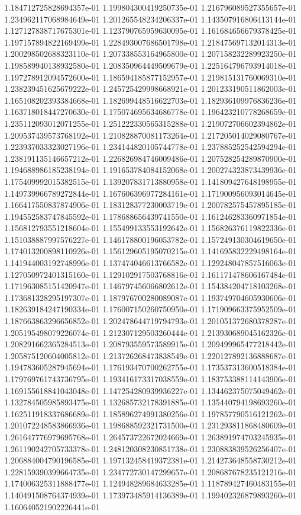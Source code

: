 1.184712725828694357e-01
1.199804300419250735e-01
1.216796089527355657e-01
1.234962117068984649e-01
1.201265548234206337e-01
1.143507916806413144e-01
1.127127838717675301e-01
1.123790765959630095e-01
1.161684656679378425e-01
1.197157894822169499e-01
1.228493007686501798e-01
1.218475697132014313e-01
1.200298502688323110e-01
1.207338553164965800e-01
1.207158232289923250e-01
1.198589940138932580e-01
1.208350964449509679e-01
1.225164796793914018e-01
1.197278912094572600e-01
1.186594185877152957e-01
1.219815131760069310e-01
1.238239451625679222e-01
1.245725429998668921e-01
1.201233190511862003e-01
1.165108202393384668e-01
1.182699448516622703e-01
1.182936109976836236e-01
1.163718018447270630e-01
1.175074695634686778e-01
1.196423210778268659e-01
1.235112093012071255e-01
1.251222330565315288e-01
1.219072706602394862e-01
1.209537439573768192e-01
1.210828870081173264e-01
1.217205014029080767e-01
1.223937033323027196e-01
1.234144820105744778e-01
1.237885252542594294e-01
1.238191135146657212e-01
1.226826984746009486e-01
1.207528254289870900e-01
1.194688986185238194e-01
1.191653784084152068e-01
1.200274323873439936e-01
1.175409992015382515e-01
1.139207831713880958e-01
1.141809427648198955e-01
1.149739966789272844e-01
1.167606396977284161e-01
1.171900956093014645e-01
1.166417550837874906e-01
1.183128377230003719e-01
1.200782575457895185e-01
1.194552583747845592e-01
1.178688656439741550e-01
1.161246283360971854e-01
1.156812793551218604e-01
1.155499133553192642e-01
1.156826376119822336e-01
1.151038887997576227e-01
1.146178800196053782e-01
1.157249130304619650e-01
1.174013200898110926e-01
1.156129605195070215e-01
1.141695832229498164e-01
1.141944003192748996e-01
1.137474046613766582e-01
1.129248047857516063e-01
1.127050972401315160e-01
1.129102917503768816e-01
1.161171478606167484e-01
1.171963085151420947e-01
1.146797456066802612e-01
1.154384204718103268e-01
1.173681328295197307e-01
1.187976700280089087e-01
1.193749704605930606e-01
1.182639184247190334e-01
1.176007150260750950e-01
1.171909663375952509e-01
1.187663863296656852e-01
1.202478644719794793e-01
1.201051372680378287e-01
1.205195498079226074e-01
1.212307129503260444e-01
1.213930689045162326e-01
1.208291662365284513e-01
1.208793559573589915e-01
1.209499965477218442e-01
1.205875120604005812e-01
1.213726268473838549e-01
1.220127892136888687e-01
1.194783605287945694e-01
1.176193470700262755e-01
1.173537313600518384e-01
1.179769761743736795e-01
1.193416173317038559e-01
1.183753388114143906e-01
1.169155618841043048e-01
1.147254280939936227e-01
1.134462375075049462e-01
1.132784505985893475e-01
1.132685732178391885e-01
1.135440794198693260e-01
1.162511918337686689e-01
1.185896274991380256e-01
1.197857790516121262e-01
1.201072248583866936e-01
1.198688592321731500e-01
1.231293811868480609e-01
1.261647776979695768e-01
1.264573722672024669e-01
1.263891974703245935e-01
1.261190242705733378e-01
1.248120308230851738e-01
1.230883839526256407e-01
1.206884004790196585e-01
1.197132458419372381e-01
1.214273648558730212e-01
1.228159390399664735e-01
1.234772730147299657e-01
1.208687678235121216e-01
1.174006325311888477e-01
1.124948289684633285e-01
1.118789427460483155e-01
1.140491508764374939e-01
1.173973485914136389e-01
1.199402326879893260e-01
1.160640521902226441e-01
